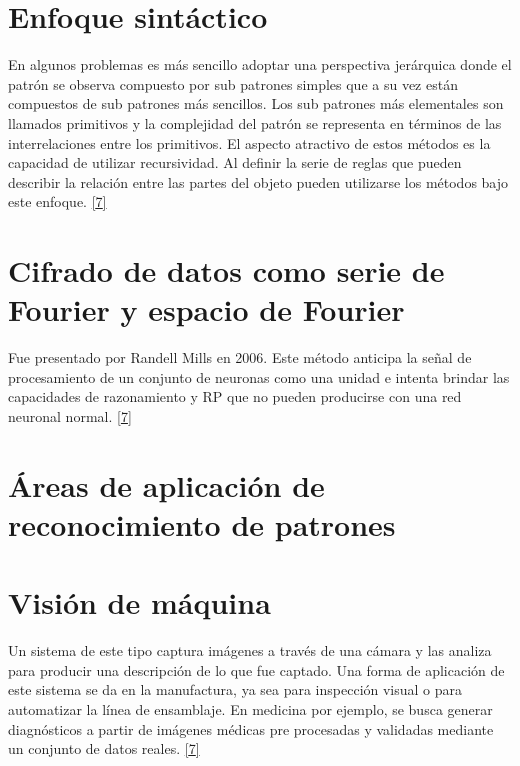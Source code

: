 \documentclass[12pt,spanish,Letterpaper,openany]{book}
\begin{document}
\hypertarget{enfoque-sintuxe1ctico}{%
\section{Enfoque sintáctico}\label{enfoque-sintuxe1ctico}}

En algunos problemas es más sencillo adoptar una perspectiva jerárquica donde el patrón se observa compuesto por sub patrones simples que a su vez están compuestos de sub patrones más sencillos. Los sub patrones más elementales son llamados primitivos y la complejidad del patrón se representa en términos de las interrelaciones entre los primitivos. El aspecto atractivo de estos métodos es la capacidad de utilizar recursividad. Al definir la serie de reglas que pueden describir la relación entre las partes del objeto pueden utilizarse los métodos bajo este enfoque. \protect\hyperlink{articulo12_ref07}{{[}7{]}}

\hypertarget{cifrado-de-datos-como-serie-de-fourier-y-espacio-de-fourier}{%
\section{Cifrado de datos como serie de Fourier y espacio de Fourier}\label{cifrado-de-datos-como-serie-de-fourier-y-espacio-de-fourier}}

Fue presentado por Randell Mills en 2006. Este método anticipa la señal de procesamiento de un conjunto de neuronas como una unidad e intenta brindar las capacidades de razonamiento y RP que no pueden producirse con una red neuronal normal. \protect\hyperlink{articulo12_ref07}{{[}7{]}}

\hypertarget{uxe1reas-de-aplicaciuxf3n-de-reconocimiento-de-patrones}{%
\section{Áreas de aplicación de reconocimiento de patrones}\label{uxe1reas-de-aplicaciuxf3n-de-reconocimiento-de-patrones}}

\hypertarget{visiuxf3n-de-muxe1quina}{%
\section{Visión de máquina}\label{visiuxf3n-de-muxe1quina}}

Un sistema de este tipo captura imágenes a través de una cámara y las analiza para producir una descripción de lo que fue captado. Una forma de aplicación de este sistema se da en la manufactura, ya sea para inspección visual o para automatizar la línea de ensamblaje. En medicina por ejemplo, se busca generar diagnósticos a partir de imágenes médicas pre procesadas y validadas mediante un conjunto de datos reales. \protect\hyperlink{articulo12_ref07}{{[}7{]}}
\end{document}
